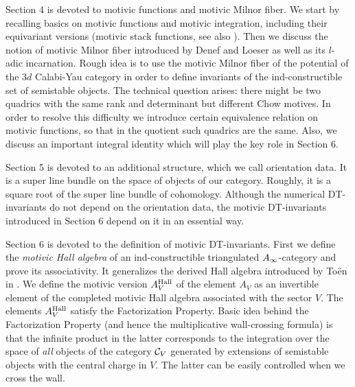 \documentclass[12pt]{article}
\begin{document}
Section 4 is devoted to motivic  functions and motivic Milnor fiber. We start by recalling basics on motivic functions and motivic integration, including their equivariant versions (motivic stack functions, see also \cite{Jo4}).  Then we discuss the notion of motivic Milnor fiber introduced by Denef and Loeser as well as its $l$-adic incarnation. Rough idea is to use the motivic Milnor fiber of the potential of the $3d$ Calabi-Yau category in order to define invariants of the ind-constructible set of semistable objects.
The technical question arises: there might be two quadrics with the same rank and determinant but different Chow motives. In order to resolve this difficulty we introduce certain equivalence relation on motivic functions, so that in the quotient such quadrics are the same. Also, we discuss an important integral identity which 
will play the key role in Section 6.

Section 5 is devoted to an additional structure, which we call orientation data. It is a super line bundle on the space of objects of our category. Roughly, it is a square root of the super line bundle of cohomology. Although the numerical DT-invariants do not depend on the orientation data, the motivic DT-invariants introduced in Section 6 depend on it in an essential way.

Section 6 is devoted to the definition of motivic DT-invariants. 
First we define the {\it motivic Hall algebra} of an ind-constructible triangulated $A_{\infty}$-category and prove its associativity. It generalizes the derived Hall algebra introduced by To\"en in \cite{To}. We define the motivic version $A_V^{\operatorname{Hall}}$ of the   element $A_V$ as an invertible element of the completed
motivic Hall algebra associated with the sector $V$. The elements $A_V^{\operatorname{Hall}}$ satisfy
the Factorization Property.
Basic idea behind the
Factorization Property (and hence the multiplicative wall-crossing formula) is that the infinite product
in the latter corresponds to the integration over the space of {\it all} objects of the category ${\mathcal C}_V$ generated
by extensions of semistable objects with the central charge in $V$. The latter can be easily controlled when we cross the wall.
\end{document}
